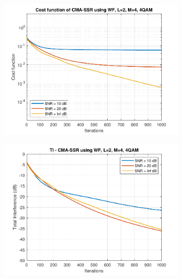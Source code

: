 \begin{figure}
	\centering
	\begin{subfigure}[b]{0.45\textwidth}
		\includegraphics[width=\linewidth]{./figs/BF_WF_cost_4QAM_L=2_M=4_K=1000.pdf}
		\label{fig:wf_costqpsk}
	\end{subfigure}
	\begin{subfigure}[b]{0.45\textwidth}
		\includegraphics[width=\linewidth]{./figs/BF_WF_TI_4QAM_L=2_M=4_K=1000.pdf}
		\label{fig:wf_ti_qpsk}
	\end{subfigure}\\
	\begin{subfigure}[b]{0.45\textwidth}

\end{subfigure}
\end{figure}
